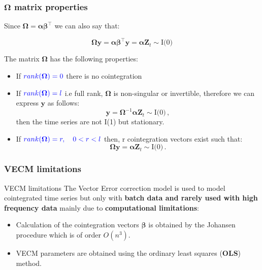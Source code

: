 \documentclass{beamer}
\begin{document}
\begin{frame}
\frametitle{$\boldsymbol \Omega$ matrix properties}

Since $\boldsymbol \Omega = \boldsymbol \alpha \boldsymbol \beta^\intercal$ we can also say that:

$$\boldsymbol \Omega \mathbf{y} = \boldsymbol \alpha \boldsymbol \beta^\intercal \mathbf{y} = \boldsymbol \alpha \mathbf{Z}_t \sim \text{I(0)}$$
 
 
The matrix $\boldsymbol \Omega$ has the following properties:
\begin{itemize}
\item If ${\color{blue}rank(\boldsymbol \Omega) = 0}$ there is no cointegration
\item If ${\color{blue}rank(\boldsymbol\Omega)=l}$ i.e full rank, $\boldsymbol\Omega$ is non-singular or invertible, therefore we can express $\mathbf{y}$ as follows:
$$\mathbf{y} = \boldsymbol \Omega ^{-1} \boldsymbol \alpha \mathbf{Z}_t \sim \text{I(0)} \, ,$$
then the time series are not I(1) but stationary.
\item If ${\color{blue}rank(\boldsymbol\Omega)=r,\quad 0 < r < l}$ then, r cointegration vectors exist such that: 
$$\boldsymbol \Omega \mathbf{y} = \boldsymbol \alpha \mathbf{Z}_t \sim \text{I(0)} \, .$$
\end{itemize}
\end{frame}


\begin{frame}
\frametitle{VECM limitations}

\begin{alertblock}{VECM limitations}
The Vector Error correction model is used to model cointegrated time series but only with {\bf batch data and rarely used with high frequency data} mainly due to {\bf computational limitations}:
\begin{itemize}
\item Calculation of the cointegration vectors $\boldsymbol \beta$ is obtained by the Johansen procedure which is of order $O(n^3)$.
\item VECM parameters are obtained using the ordinary least squares ({\bf OLS}) method.
\end{itemize}
\end{alertblock}
\end{frame}
\end{document}

